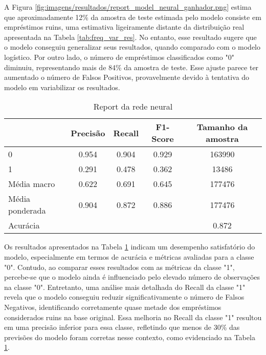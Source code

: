 


A Figura \ref{fig:imagens/resultados/report_model_neural_ganhador.png} estima que aproximadamente 
12\% da amostra de teste estimada pelo modelo consiste em empréstimos ruins, uma estimativa ligeiramente distante 
da distribuição real apresentada na Tabela \ref{tab:freq_var_res}. No entanto, esse resultado 
sugere que o modelo conseguiu generalizar seus resultados, quando comparado com o modelo logístico. 
Por outro lado, o número de empréstimos
classificados como "0" diminuiu, representando mais de 84\% da amostra de teste. Esse ajuste 
parece ter aumentado o número de Falsos Positivos, provavelmente devido à tentativa do modelo
em variabilizar os resultados.


\begin{table}[H]
  \centering
\begin{tabular}{lcccc}
  \hline
  &    \textbf{Precisão} & \textbf{Recall}    &   \textbf{F1-Score} &  \textbf{Tamanho da amostra} \\
  \hline
   0                &    0.954 & 0.904 &   0.929 & 163990        \\
   1                &    0.291 & 0.478 &   0.362 & 13486         \\
   Média macro      &    0.622 & 0.691 &   0.645 & 177476        \\
   Média ponderada  &    0.904 & 0.872 &   0.886 & 177476        \\ \hline
   Acurácia         &          &       &         & 0.872      \\
  \hline
\end{tabular}
\caption{Report da rede neural}
\label{tab:report_model_neural_ganhador}
\end{table}


Os resultados apresentados na Tabela \ref{tab:report_model_neural_ganhador} indicam um desempenho satisfatório
do modelo, especialmente em termos de acurácia e métricas avaliadas para a classe "0". 
Contudo, ao comparar esses resultados com as métricas da classe "1", percebe-se que o modelo ainda
é influenciado pelo elevado número de observações na classe "0". Entretanto, uma análise mais detalhada 
do Recall da classe "1" revela que o modelo conseguiu reduzir significativamente o número de Falsos Negativos,
identificando corretamente quase metade dos empréstimos considerados ruins na base original. Essa melhoria 
no Recall da classe "1" resultou em uma precisão inferior para essa classe, refletindo que menos de 30\% 
das previsões do modelo foram corretas nesse contexto, como evidenciado na Tabela \ref{tab:report_model_neural_ganhador}.


